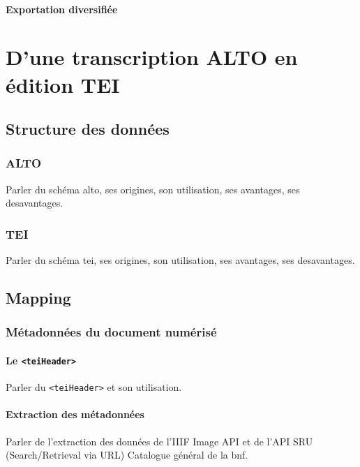 \documentclass[a4paper,12pt,twoside]{book}
\begin{document}
	\subsection{Exportation diversifiée}
	
	
	\part{D'une transcription ALTO en édition TEI}

	\chapter{Structure des données}
	
	\section{ALTO}
	
	Parler du schéma \acrshort{alto}, ses origines, son utilisation, ses avantages, ses desavantages.
	
	\section{TEI}
	
	Parler du schéma \acrshort{tei}, ses origines, son utilisation, ses avantages, ses desavantages.
	
	\chapter{Mapping}
	
	\section{Métadonnées du document numérisé}
	
	\subsection{Le \texttt{<teiHeader>}}
	
	Parler du \texttt{<teiHeader>} et son utilisation.
	
	\subsection{Extraction des métadonnées}
	
	Parler de l'extraction des données de l'IIIF Image API et de l'API SRU (Search/Retrieval via URL) Catalogue général de la \acrshort{bnf}.
	
\end{document}
